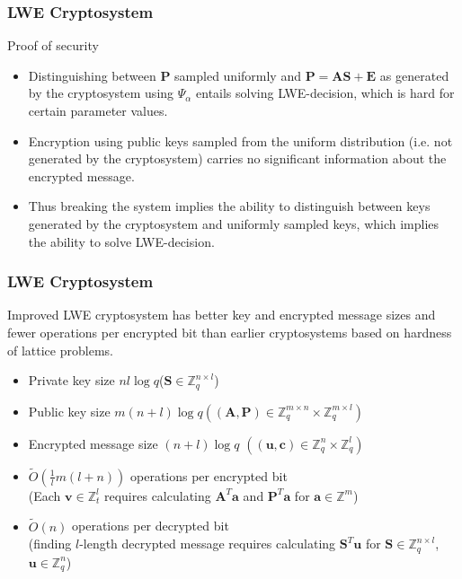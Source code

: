 \documentclass{beamer}
\renewcommand{\v}{\mathbf}
\begin{document}
\begin{frame}
\frametitle{LWE Cryptosystem}
\begin{block}{Proof of security}
    \begin{itemize}
    \item
        Distinguishing between $\v{P}$ sampled uniformly and $\v{P} = \v{AS+E}$ as
    generated by the cryptosystem using $\Psi_\alpha$ entails solving LWE-decision, which is hard for certain parameter values.
    \item
    Encryption using public keys sampled from the uniform distribution (i.e. not generated
    by the cryptosystem) carries no significant information
    about the encrypted message.
\item Thus breaking the system implies the ability to distinguish between keys 
    generated by the cryptosystem and uniformly sampled keys,
    which implies the ability to solve LWE-decision.
    \end{itemize}
\end{block}
\end{frame}

\begin{frame}
\frametitle{LWE Cryptosystem}
    Improved LWE cryptosystem has better key and encrypted message sizes and fewer
    operations per encrypted bit than earlier cryptosystems
    based on hardness of lattice problems.
    \begin{itemize}
        \item Private key size $nl\log{q}$\quad ($\v{S} \in \mathbb{Z}_q^{n \times l}$)
        \item Public key size $m(n+l)\log{q}$\quad $\left((\v{A},\v{P}) \in \mathbb{Z}_q^{m \times n} \times \mathbb{Z}_q^{m \times l}\right)$
        \item Encrypted message size $(n+l)\log{q}$ \quad $\left((\v{u,c}) \in 
            \mathbb{Z}_q^n \times\mathbb{Z}_q^l\right)$
        \item $\tilde{O}\left(\frac{1}{l}m\left(l+n\right)\right)$
            operations per encrypted bit \\
            (Each $\v{v} \in \mathbb{Z}_t^l$ requires calculating
            $\v{A}^T\v{a}$ and $\v{P}^T\v{a}$ for $\v{a} \in \mathbb{Z}^m$)
        \item $\tilde{O}(n)$
            operations per decrypted bit \\
            (finding $l$-length decrypted message requires calculating
            $\v{S}^T\v{u}$ for $\v{S} \in \mathbb{Z}_q^{n \times l}$,
            $\v{u} \in \mathbb{Z}_q^n$)
    \end{itemize}
\end{frame}
\end{document}
